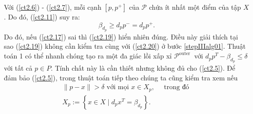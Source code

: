 \documentclass[12pt,a4paper,openany,oneside]{report}
\begin{document}
Với (\ref{ct2.6}) - (\ref{ct2.7}), mỗi cạnh $\left[p, p^{+}\right]$ của $\mathcal{P}$ chứa ít nhất một điểm của tập $X$. Do đó, (\ref{ct2.11}) suy ra:
$$
\beta_{d_p} \geq d_p p^{-}=d_p p^{+} .
$$
Do đó, nếu (\ref{ct2.17}) sai thì (\ref{ct2.19}) hiển nhiên đúng. Điều này giải thích tại sao (\ref{ct2.19}) không cần kiểm tra cùng với (\ref{ct2.20}) ở bước \ref{stepIIIalg01}.
Thuật toán 1 có thể nhanh chóng tạo ra một đa giác lồi xấp xỉ $\mathcal{P}^{\text {outer }}$ với $d_p p^T-\beta_{d_p} \leq \delta$ với tất cả $p \in P$.
Tính chất này là cần thiết nhưng không đủ cho (\ref{ct2.5}). Để đảm bảo (\ref{ct2.5}), trong thuật toán tiếp theo chúng ta cũng kiểm tra xem nếu 
\begin{equation}\label{ct2.26}
	\begin{array}{lcl}
	 \|p-x\|>\delta \text { với mọi } x \in X_p, \quad \text { trong đó } \\
	 X_p:=\left\{x \in X \mid d_p x^T=\beta_{d_p}\right\} .
	\end{array}
\end{equation}
\end{document}

